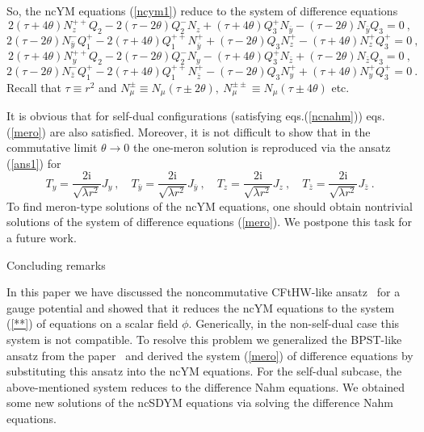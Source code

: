 \documentclass[a4paper,11pt]{article}
\makeatletter
\renewcommand{\section}{\@startsection{section}{1}{0pt}{\medskipamount}
{\medskipamount}{\large\bf}}
\numberwithin{equation}{section}
\def\th{\theta}
\def\l{\lambda}
\def\m{\mu}
\newcommand{\im}{\mathrm{i}}
\newcommand{\zb}{{\bar{z}}}
\newcommand{\yb}{{\bar{y}}}
\makeatother
\begin{document}
So, the ncYM equations (\ref{ncym1}) reduce to the system of difference equations
$$
 2(\tau + 4\th)N^{++}_zQ_2 - 2(\tau -2\th)Q_2^-N_z + (\tau + 4\th)Q_3^+ N_\yb
- (\tau - 2\th)N_\yb Q_3 = 0\ ,
$$
$$
 2(\tau -2\th) N^-_\yb Q_1^+ - 2(\tau + 4\th) Q_1^{++}N^+_\yb + (\tau -2\th)Q_3 N^+_z
- (\tau + 4\th)N^+_zQ_3^+ =0\ ,
$$
$$
 2(\tau + 4\th)N^{++}_yQ_2 - 2(\tau -2\th )Q_2^-N_y - (\tau + 4\th )Q_3^+ N_\zb
+ (\tau - 2\th )N_\zb Q_3=0\ ,
$$
\begin{equation}\label{mero}
2(\tau -2\th) N^-_\zb Q_1^+ - 2(\tau + 4\th) Q_1^{++}N^+_\zb  
- (\tau - 2\th )Q_3 N^+_y + (\tau + 4\th) N^+_yQ_3^+ =0\ .
\end{equation}
Recall that $\tau \equiv r^2$ and $N_\m^\pm \equiv N_\m (\tau \pm 2\th ),\ N_\m^{\pm\pm} \equiv 
N_\m (\tau \pm 4\th )$ etc.

It is obvious that for self-dual configurations (satisfying  eqs.(\ref{ncnahm}))
eqs.(\ref{mero}) are also satisfied. 
Moreover, it is not difficult to show that in the commutative limit $\th\to 0$ 
the one-meron solution is reproduced via the ansatz (\ref{ans1}) for
\begin{equation}
T_y=\frac{2\im}{\sqrt{\l r^2}}J_y\ ,\quad T_\yb=\frac{2\im}{\sqrt{\l r^2}}J_\yb\ ,\quad
T_z=\frac{2\im}{\sqrt{\l r^2}}J_z\ ,\quad T_\zb=\frac{2\im}{\sqrt{\l r^2}}J_\zb\ .
\end{equation}
To find meron-type solutions of the ncYM equations, one should obtain nontrivial
solutions of the system of difference equations (\ref{mero}).
We postpone this task for a future work.


\section{Concluding remarks}

In this paper  we have discussed the noncommutative CFtHW-like 
ansatz~\cite{Correa1, LP1} for a gauge potential 
 and showed that it reduces the ncYM equations to the system (\ref{**}) of equations
on a scalar field $\phi$. Generically, in the non-self-dual case this system is not compatible.
To resolve this problem we generalized the BPST-like ansatz from the paper~\cite{Correa1}
and derived the system (\ref{mero}) of difference equations by substituting this ansatz into the
ncYM equations. For the self-dual subcase, the above-mentioned system reduces to 
the difference Nahm equations. We obtained some new solutions of the ncSDYM 
equations via solving the difference Nahm equations.
\end{document}
